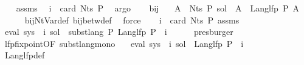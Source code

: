\begin{isabellebody}
\ \ \isamarkupfalse%
\ assms\ \isamarkupfalse%
\ {\isachardoublequoteopen}i\ {\isacharless}{\kern0pt}\ card\ {\isacharparenleft}{\kern0pt}Nts\ P{\isacharparenright}{\kern0pt}{\isachardoublequoteclose}\ \isamarkupfalse%
\ argo\isanewline
\ \ \isamarkupfalse%
\ bij{\isacharunderscore}{\kern0pt}{\isasymgamma}{\isacharunderscore}{\kern0pt}{\isasymgamma}{\isacharprime}{\kern0pt}\ \isamarkupfalse%
\ {\isacharasterisk}{\kern0pt}{\isacharcolon}{\kern0pt}\ {\isachardoublequoteopen}{\isasymforall}A\ {\isasymin}\ Nts\ P{\isachardot}{\kern0pt}\ sol\ {\isacharparenleft}{\kern0pt}{\isasymgamma}{\isacharprime}{\kern0pt}\ A{\isacharparenright}{\kern0pt}\ {\isacharequal}{\kern0pt}\ Lang{\isacharunderscore}{\kern0pt}lfp\ P\ A{\isachardoublequoteclose}\isanewline
\ \ \ \ \isamarkupfalse%
\ bij{\isacharunderscore}{\kern0pt}Nt{\isacharunderscore}{\kern0pt}Var{\isacharunderscore}{\kern0pt}def\ bij{\isacharunderscore}{\kern0pt}betw{\isacharunderscore}{\kern0pt}def\ \isamarkupfalse%
\ force\isanewline
\ \ \isamarkupfalse%
\ {\isacartoucheopen}i\ {\isacharless}{\kern0pt}\ card\ {\isacharparenleft}{\kern0pt}Nts\ P{\isacharparenright}{\kern0pt}{\isacartoucheclose}\ assms\ \isamarkupfalse%
\ {\isachardoublequoteopen}eval\ {\isacharparenleft}{\kern0pt}sys\ {\isacharbang}{\kern0pt}\ i{\isacharparenright}{\kern0pt}\ sol\ {\isacharequal}{\kern0pt}\ subst{\isacharunderscore}{\kern0pt}lang\ P\ {\isacharparenleft}{\kern0pt}Lang{\isacharunderscore}{\kern0pt}lfp\ P{\isacharparenright}{\kern0pt}\ {\isacharparenleft}{\kern0pt}{\isasymgamma}\ i{\isacharparenright}{\kern0pt}{\isachardoublequoteclose}\isanewline
\ \ \ \ \isamarkupfalse%
\ presburger\isanewline
\ \ \isamarkupfalse%
\ lfp{\isacharunderscore}{\kern0pt}fixpoint{\isacharbrackleft}{\kern0pt}OF\ subst{\isacharunderscore}{\kern0pt}lang{\isacharunderscore}{\kern0pt}mono{\isacharbrackright}{\kern0pt}\ \isamarkupfalse%
\ {}{\isacharcolon}{\kern0pt}\ {\isachardoublequoteopen}eval\ {\isacharparenleft}{\kern0pt}sys\ {\isacharbang}{\kern0pt}\ i{\isacharparenright}{\kern0pt}\ sol\ {\isacharequal}{\kern0pt}\ Lang{\isacharunderscore}{\kern0pt}lfp\ P\ {\isacharparenleft}{\kern0pt}{\isasymgamma}\ i{\isacharparenright}{\kern0pt}{\isachardoublequoteclose}\isanewline
\ \ \ \ \isamarkupfalse%
\ Lang{\isacharunderscore}{\kern0pt}lfp{\isacharunderscore}{\kern0pt}def\ \isamarkupfalse%

\end{isabellebody}
